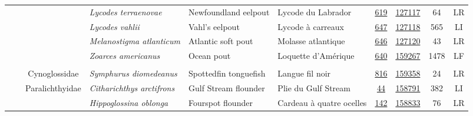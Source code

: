 \documentclass[12pt]{article}\usepackage[]{graphicx}\usepackage[]{color}
\begin{document}
\begin{landscapepage}
\begin{longtable}[t]{ccc>{\centering\arraybackslash}p{3cm}>{\centering\arraybackslash}p{3cm}>{\centering\arraybackslash}p{3cm}>{}c>{}ccc}
\hspace{1em}\hspace{1em} &  &  & \em{Lycodes terraenovae} & Newfoundland eelpout & Lycode du Labrador & \href{#sec:143}{619} & \href{http://www.marinespecies.org/aphia.php?p=taxdetails&id=158907}{127117} & 64 & LR\\
\hspace{1em}\hspace{1em} &  &  & \em{Lycodes vahlii} & Vahl's eelpout & Lycode à carreaux & \href{#sec:816}{647} & \href{http://www.marinespecies.org/aphia.php?p=taxdetails&id=159358}{127118} & 565 & LI\\
\hspace{1em}\hspace{1em} &  &  & \em{Melanostigma atlanticum} & Atlantic soft pout & Molasse atlantique & \href{#sec:50}{646} & \href{http://www.marinespecies.org/aphia.php?p=taxdetails&id=126758}{127120} & 43 & LR\\
\hspace{1em}\hspace{1em} &  &  & \em{Zoarces americanus} & Ocean pout & Loquette d'Amérique & \href{#sec:51}{640} & \href{http://www.marinespecies.org/aphia.php?p=taxdetails&id=126759}{159267} & 1478 & LF\\
\addlinespace[0.3em]
\\
\hspace{1em}\hspace{1em} &  & Cynoglossidae & \em{Symphurus diomedeanus} & Spottedfin tonguefish & Langue fil noir & \href{#sec:52}{816} & \href{http://www.marinespecies.org/aphia.php?p=taxdetails&id=126757}{159358} & 24 & LR\\
\hspace{1em}\hspace{1em} &  & Paralichthyidae & \em{Citharichthys arctifrons} & Gulf Stream flounder & Plie du Gulf Stream & \href{#sec:70}{44} & \href{http://www.marinespecies.org/aphia.php?p=taxdetails&id=127023}{158791} & 382 & LI\\
\hspace{1em}\hspace{1em} &  &  & \em{Hippoglossina oblonga} & Fourspot flounder & Cardeau à quatre ocelles & \href{#sec:122}{142} & \href{http://www.marinespecies.org/aphia.php?p=taxdetails&id=159785}{158833} & 76 & LR\\

\end{longtable}
\end{landscapepage}
\end{document}
